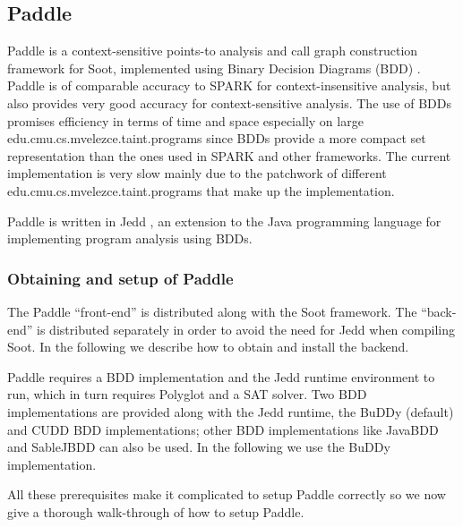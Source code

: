 \documentclass{article}
\begin{document}
\subsection{Paddle}
Paddle is a context-sensitive points-to analysis and call graph
construction framework for Soot, implemented using Binary
Decision Diagrams (BDD) \cite{bern.lhot.ea03}. Paddle is of comparable
accuracy to SPARK for context-insensitive analysis, but also provides
very good accuracy for context-sensitive analysis. The use of BDDs
promises efficiency in terms of time and space especially on large
edu.cmu.cs.mvelezce.taint.programs \cite{bern.lhot.ea03} since BDDs provide a more compact set
representation than the ones used in SPARK and other frameworks. The
current implementation is very slow mainly due to the patchwork of
different edu.cmu.cs.mvelezce.taint.programs that make up the implementation.

Paddle is written in Jedd \cite{jedd}, an extension to the Java
programming language for implementing program analysis using BDDs.

\subsubsection*{Obtaining and setup of Paddle}
The Paddle ``front-end'' is distributed along with the Soot
framework. The ``back-end'' is distributed separately in order to
avoid the need for Jedd when compiling Soot. In the following we
describe how to obtain and install the backend.

Paddle requires a BDD implementation and the Jedd runtime environment
to run, which in turn requires Polyglot and a SAT solver. Two BDD
implementations are provided along with the Jedd runtime, the
BuDDy (default) and CUDD BDD implementations; other BDD implementations
like JavaBDD and SableJBDD can also be used. In the following we use
the BuDDy implementation.

All these prerequisites make it complicated to setup Paddle correctly
so we now give a thorough walk-through of how to setup Paddle.
\end{document}
